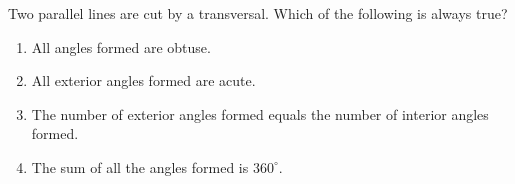 Two parallel lines are cut by a transversal. Which of the following is always true?
\begin{enumerate}
\item[(a)] All angles formed are obtuse.
\item[(b)] All exterior angles formed are acute.
\item[(c)] The number of exterior angles formed equals the number of interior angles formed.
\item[(d)] The sum of all the angles formed is $360^\circ$.
\end{enumerate}
